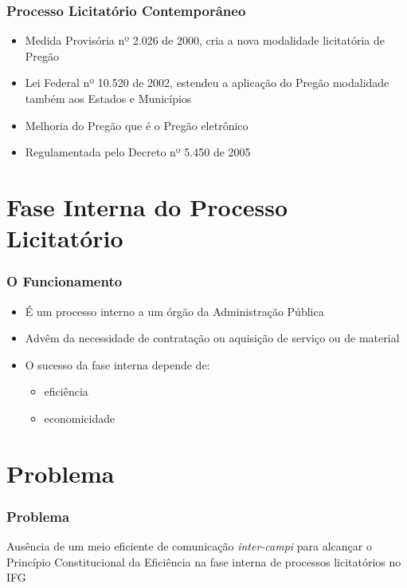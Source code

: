 \documentclass{beamer}
\begin{document}
		\begin{frame}\frametitle{Processo Licitatório Contemporâneo}
			\begin{itemize}
				\item Medida Provisória nº 2.026 de 2000, cria a nova modalidade licitatória de Pregão
				\item Lei Federal nº 10.520 de 2002, estendeu a aplicação do Pregão modalidade também aos Estados e Municípios
				\item Melhoria do Pregão que é o Pregão eletrônico
				\item Regulamentada pelo Decreto nº 5.450 de 2005
			\end{itemize}
		\end{frame}
		
	\section{Fase Interna do Processo Licitatório}
		\begin{frame}\frametitle{O Funcionamento}
			
			\begin{itemize}
				\item É um processo interno a um órgão da Administração Pública
				\item Advêm da necessidade de contratação ou aquisição de serviço ou de material
			
				\item O sucesso da fase interna depende de:
				\begin{itemize}
					\item eficiência
					\item economicidade
				\end{itemize}
			\end{itemize}
		\end{frame}
	
	\section{Problema}
	\begin{frame}\frametitle{Problema}
	
	Ausência de um meio eficiente de comunicação \textit{inter-campi} para alcançar o Princípio
	Constitucional da Eficiência na fase interna de processos licitatórios no IFG
	
	\end{frame}
\end{document}

